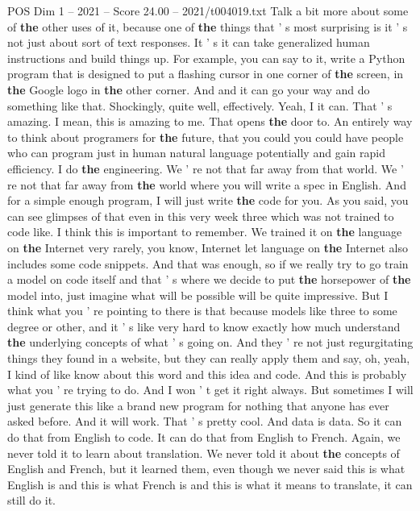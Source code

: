 \begin{textsample}{POS Dim 1 – 2021 – Score 24.00 – 2021/t004019.txt}
Talk a bit more about some of \textbf{the} other uses of it, because one of \textbf{the} things that ' s most surprising is it ' s not just about sort of text responses.
It ' s it can take generalized human instructions and build things up.
For example, you can say to it, write a Python program that is designed to put a flashing cursor in one corner of \textbf{the} screen, in \textbf{the} Google logo in \textbf{the} other corner.
And and it can go your way and do something like that.
Shockingly, quite well, effectively.
Yeah, I it can.
That ' s amazing.
I mean, this is amazing to me.
That opens \textbf{the} door to.
An entirely way to think about programers for \textbf{the} future, that you could you could have people who can program just in human natural language potentially and gain rapid efficiency.
I do \textbf{the} engineering.
We ' re not that far away from that world.
We ' re not that far away from \textbf{the} world where you will write a spec in English.
And for a simple enough program, I will just write \textbf{the} code for you.
As you said, you can see glimpses of that even in this very week three which was not trained to code like.
I think this is important to remember.
We trained it on \textbf{the} language on \textbf{the} Internet very rarely, you know, Internet let language on \textbf{the} Internet also includes some code snippets.
And that was enough, so if we really try to go train a model on code itself and that ' s where we decide to put \textbf{the} horsepower of \textbf{the} model into, just imagine what will be possible will be quite impressive.
But I think what you ' re pointing to there is that because models like three to some degree or other, and it ' s like very hard to know exactly how much understand \textbf{the} underlying concepts of what ' s going on.
And they ' re not just regurgitating things they found in a website, but they can really apply them and say, oh, yeah, I kind of like know about this word and this idea and code.
And this is probably what you ' re trying to do.
And I won ' t get it right always.
But sometimes I will just generate this like a brand new program for nothing that anyone has ever asked before.
And it will work.
That ' s pretty cool.
And data is data.
So it can do that from English to code.
It can do that from English to French.
Again, we never told it to learn about translation.
We never told it about \textbf{the} concepts of English and French, but it learned them, even though we never said this is what English is and this is what French is and this is what it means to translate, it can still do it.

\end{textsample}
